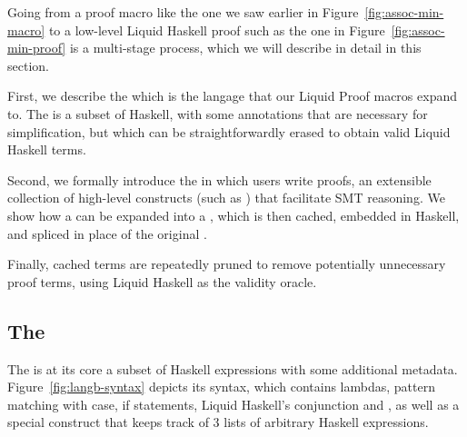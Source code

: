 % 
% 
  

Going from a proof macro like the one we saw earlier in
Figure~\ref{fig:assoc-min-macro} to a low-level Liquid Haskell proof
such as the one in Figure~\ref{fig:assoc-min-proof} is a
multi-stage process, which we will describe in detail in this section.

First, we describe the \LangB which is the langage that our Liquid
Proof macros expand to. The \LangB is a subset of Haskell, with some
annotations that are necessary for simplification, but which can be
straightforwardly erased to obtain valid Liquid Haskell terms.

Second, we formally introduce the \LangA in which users write proofs,
an extensible collection of high-level constructs (such as
) that facilitate SMT reasoning. We show how a \LangATerm
can be expanded into a \LangBTerm, which is then cached, embedded in
Haskell, and spliced in place of the original \LangATerm.

Finally, cached terms are repeatedly pruned to remove potentially
unnecessary proof terms, using Liquid Haskell as the validity oracle.


\subsection{The \LangB}
\label{sec:proto-proof}

The \LangB is at its core a subset of Haskell expressions with some
additional metadata.  Figure~\ref{fig:langb-syntax} depicts its
syntax, which contains lambdas, pattern matching with case, if
statements, Liquid Haskell's conjunction \LC{&&&} and , as
well as a special construct  that keeps track of 3 lists of
arbitrary Haskell expressions. 



